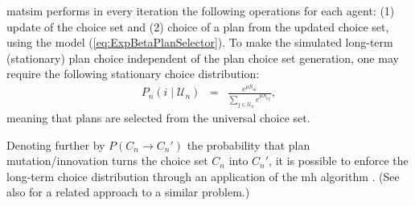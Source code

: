 
\gls{matsim} performs in every iteration the following operations for each
agent: (1) update of the choice set and (2) choice of a plan from
the updated choice set, using the model (\ref{eq:ExpBetaPlanSelector}).
To make the simulated long-term (stationary) plan choice independent
of the plan choice set generation, one may require the following stationary
choice distribution:
\begin{eqnarray}
P_{n}(i\mid \mathcal{U}_n) & = & \frac{e^{\mu S_{ni}}}{\sum_{j\in \mathcal{U}_n}e^{\mu S_{nj}}},
\label{eq:global-choice-model}
\end{eqnarray}
meaning that plans are selected from the universal choice set.

Denoting further by $P(C_{n}\rightarrow C_{n}')$ the probability
that plan mutation/innovation turns the choice set $C_{n}$ into $C_{n}'$,
it is possible to enforce the long-term choice distribution 
through an application of the \gls{mh} algorithm \citep{hastings-1970}.
(See also \citet{floetteroed-2012b} for a related approach to a similar
problem.) 

